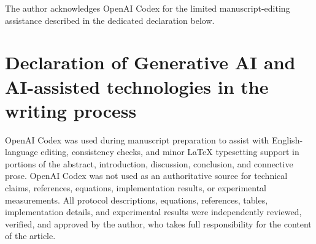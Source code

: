 \documentclass[preprint,12pt]{elsarticle}
\theoremstyle{remark}
\begin{document}
The author acknowledges OpenAI Codex for the limited manuscript-editing
assistance described in the dedicated declaration below.

\section*{Declaration of Generative AI and AI-assisted technologies in the writing process}

OpenAI Codex was used during manuscript preparation to assist with
English-language editing, consistency checks, and minor \LaTeX{}
typesetting support in portions of the abstract, introduction,
discussion, conclusion, and connective prose. OpenAI Codex was not used
as an authoritative source for technical claims, references, equations,
implementation results, or experimental measurements. All protocol
descriptions, equations, references, tables, implementation details, and
experimental results were independently reviewed, verified, and approved
by the author, who takes full responsibility for the content of the
article.
\end{document}
